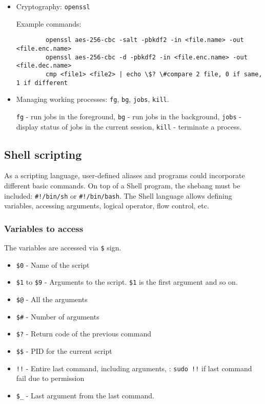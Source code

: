 \begin{itemize}
	\item Cryptography: \verb|openssl|
	
	Example commands:
	\begin{verbatim}
		openssl aes-256-cbc -salt -pbkdf2 -in <file.name> -out <file.enc.name>
		openssl aes-256-cbc -d -pbkdf2 -in <file.enc.name> -out <file.dec.name>
		cmp <file1> <file2> | echo \$? \#compare 2 file, 0 if same, 1 if different	
	\end{verbatim}
	\item Managing working processes: \verb|fg|, \verb|bg|, \verb|jobs|, \verb|kill|.
	
	\verb|fg| - run jobs in the foreground, \verb|bg| - run jobs in the background, \verb|jobs| - display status of jobs in the current session, \verb|kill| - terminate a process.	
\end{itemize}

\subsection{Shell scripting}

As a scripting language, user-defined aliases and programs could incorporate different basic commands. On top of a Shell program, the shebang must be included: \verb|#!/bin/sh| or \verb|#!/bin/bash|. The Shell language allows defining variables, accessing arguments, logical operator, flow control, etc.

\subsubsection{Variables to access}

The variables are accessed via \verb|$| sign.
\begin{itemize}
	\setlength\itemsep{0em}
	\item \verb|$0| - Name of the script
	\item \verb|$1| to \verb|$9| - Arguments to the script. \verb|$1| is the first argument and so on.
	\item \verb|$@| - All the arguments
	\item \verb|$#| - Number of arguments
	\item \verb|$?| - Return code of the previous command
	\item \verb|$$| - \ac{PID} for the current script
	\item \verb|!!| - Entire last command, including arguments, \eg: \verb|sudo !!| if last command fail due to permission
	\item \verb|$_| - Last argument from the last command.
\end{itemize}

